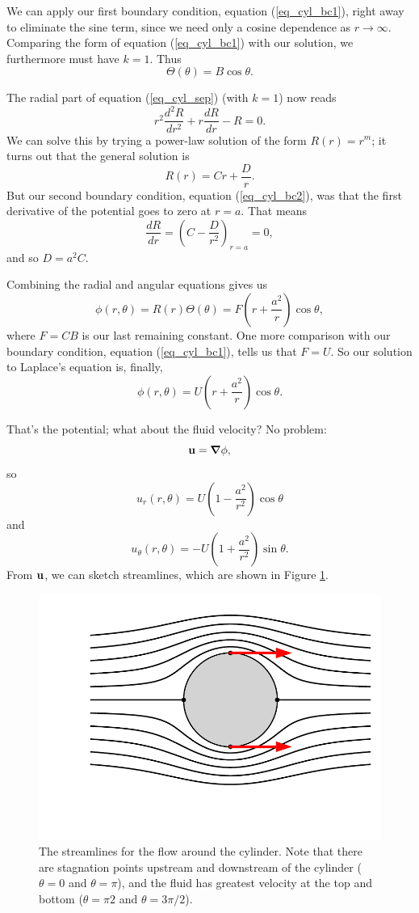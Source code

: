We can apply our first boundary condition, equation (\ref{eq_cyl_bc1}), right away to eliminate the sine term, since we need only a cosine dependence as $r \to \infty$.  Comparing the form of equation (\ref{eq_cyl_bc1}) with our solution, we furthermore must have $k=1$.  Thus 
\begin{equation}
\Theta(\theta) = B \cos \theta.
\end{equation}

The radial part of equation (\ref{eq_cyl_sep}) (with $k = 1$) now reads
\[
r^2 \frac{d^2R}{dr^2} + r \frac{dR}{dr} - R = 0.
\]
We can solve this by trying a power-law solution of the form $R(r) = r^m$; it turns out that the general solution is
\[
R(r) = Cr + \frac{D}{r}.
\]
But our second boundary condition, equation (\ref{eq_cyl_bc2}), was that the first derivative of the potential goes to zero at $r=a$.  That means
\[
\frac{dR}{dr} = \left( C - \frac{D}{r^2} \right)_{r=a} = 0,
\]
and so $D = a^2 C$.

Combining the radial and angular equations gives us
\[
\phi(r, \theta) = R(r) \Theta(\theta) = F \left( r+\frac{a^2}{r} \right) \cos \theta,
\]
where $F=CB$ is our last remaining constant.  One more comparison with our boundary condition, equation (\ref{eq_cyl_bc1}), tells us that $F = U$.  So our solution to Laplace's equation is, finally, 
\begin{equation}
\phi(r, \theta) = U \left( r+\frac{a^2}{r} \right) \cos \theta.
\end{equation}

That's the potential; what about the fluid velocity?  No problem:
\[
\mathbf{u} = \boldsymbol{\nabla} \phi,
\]
so
\begin{equation}
u_r(r, \theta) = U \left( 1 - \frac{a^2}{r^2} \right) \cos \theta
\end{equation}
and
\begin{equation}
u_\theta(r, \theta) = -U \left( 1 + \frac{a^2}{r^2} \right) \sin \theta.
\end{equation}
From $\mathbf{u}$, we can sketch streamlines, which are shown in Figure \ref{fig_cyl_streamlines}.

\begin{figure}
\centering\includegraphics[width=0.7\linewidth]{Figures/Chapter3/fig_cylinder_stream}
\caption{The streamlines for the flow around the cylinder.  Note that there are stagnation points upstream and downstream of the cylinder ($\theta = 0$ and $\theta = \pi$), and the fluid has greatest velocity at the top and bottom ($\theta = \pi2$ and $\theta = 3\pi/2$).}
\label{fig_cyl_streamlines}
\end{figure}

